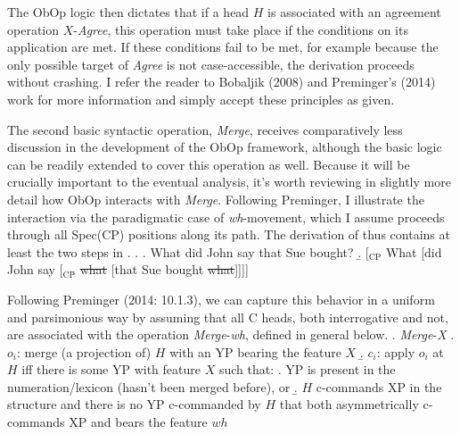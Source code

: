 \documentclass[11pt, letterpaper]{paper_nick}
\begin{document}
The ObOp logic then dictates that if a head $H$ is associated with an agreement operation $X$-\emph{Agree}, this operation must take place if the conditions on its application are met. If these conditions fail to be met, for example because the only possible target of \emph{Agree} is not case-accessible, the derivation proceeds without crashing. I refer the reader to Bobaljik (2008) and Preminger's (2014) work for more information and simply accept these principles as given.  

The second basic syntactic operation, \emph{Merge}, receives comparatively less discussion in the development of the ObOp framework, although the basic logic can be readily extended to cover this operation as well. Because it will be crucially important to the eventual analysis, it's worth reviewing in slightly more detail how ObOp interacts with \emph{Merge}. Following Preminger, I illustrate the interaction via the paradigmatic case of \emph{wh}-movement, which I assume proceeds through all Spec(CP) positions along its path. The derivation of \Next[a] thus contains at least the two steps in \Next[b].
\ex. \a. What did John say that Sue bought?
\b. [$_\text{CP}$ What [did John say [$_\text{CP}$ \st{what} [that Sue bought \st{what}]]]]

Following Preminger (2014: 10.1.3), we can capture this behavior in a uniform and parsimonious way by assuming that all C heads, both interrogative and not, are associated with the operation \emph{Merge}-\emph{wh}, defined in general below.
\ex. \emph{Merge}-\emph{X}
\a. $o_i$: merge (a projection of) $H$ with an YP bearing the feature $X$
\b. $c_i$: apply $o_i$ at $H$ iff there is some YP with feature $X$ such that:
\a. YP is present in the numeration/lexicon (hasn't been merged before), or 
\b. $H$ c-commands XP in the structure and there is no YP c-commanded by $H$ that both asymmetrically c-commands XP and bears the feature $wh$
\end{document}
